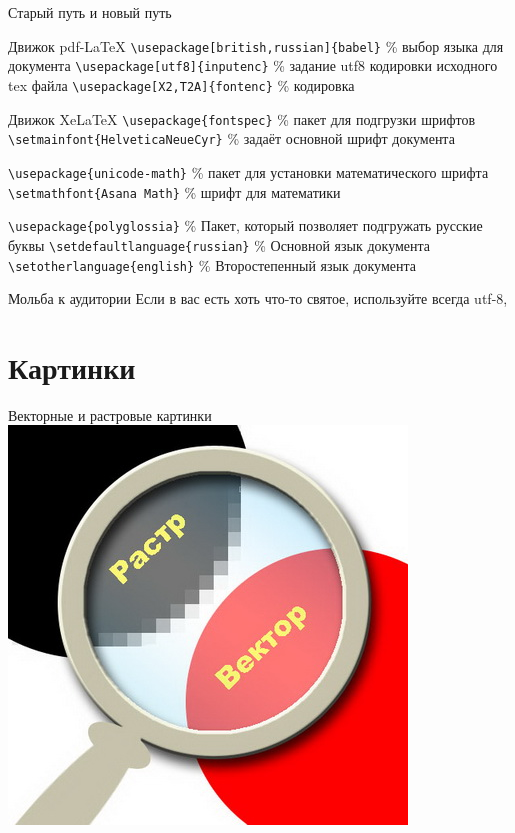 \documentclass[newPxFont]{beamer}
\begin{document}
\begin{frame}{Старый путь и новый путь}

\begin{block}{Движок pdf-LaTeX}
\verb|\usepackage[british,russian]{babel}| \% выбор языка для документа
\verb|\usepackage[utf8]{inputenc}|         \% задание utf8 кодировки исходного tex файла
\verb|\usepackage[X2,T2A]{fontenc}|        \% кодировка
\end{block}

\begin{block}{Движок XeLaTeX}
\verb|\usepackage{fontspec}|            \% пакет для подгрузки шрифтов
\verb|\setmainfont{HelveticaNeueCyr}|   \% задаёт основной шрифт документа

\verb|\usepackage{unicode-math}|     \% пакет для установки математического шрифта
\verb|\setmathfont{Asana Math}|      \% шрифт для математики

\verb|\usepackage{polyglossia}|      \% Пакет, который позволяет подгружать русские буквы
\verb|\setdefaultlanguage{russian}|  \% Основной язык документа
\verb|\setotherlanguage{english}|    \% Второстепенный язык документа
\end{block}
\end{frame}

\begin{frame}{Мольба к аудитории} 
Если в вас есть хоть что-то святое, используйте всегда utf-8, 
\end{frame}

\section{Картинки} 

\begin{frame}{Векторные и растровые картинки} 
\includegraphics[scale=0.8]{rv.jpg}
\end{frame}
\end{document}
